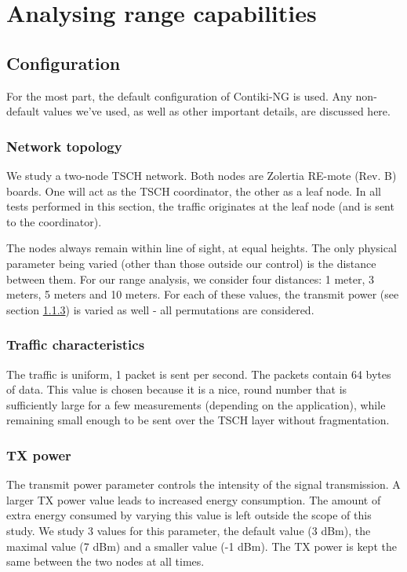 \documentclass[conference]{IEEEtran}
\begin{document}
%
%



\section{Analysing range capabilities}
\label{section:task3}

\subsection{Configuration} 
For the most part, the default configuration of Contiki-NG is used. Any non-default values we've used, as well as other important details, are discussed here.

\subsubsection{Network topology}
We study a two-node TSCH network. Both nodes are Zolertia RE-mote (Rev. B) boards. One will act as the TSCH coordinator, the other as a leaf node. In all tests performed in this section, the traffic originates at the leaf node (and is sent to the coordinator). 

The nodes always remain within line of sight, at equal heights. The only physical parameter being varied (other than those outside our control) is the distance between them. For our range analysis, we consider four distances: 1 meter, 3 meters, 5 meters and 10 meters. For each of these values, the transmit power (see section \ref{section:txpower}) is varied as well - all permutations are considered. 

\subsubsection{Traffic characteristics}
The traffic is uniform, 1 packet is sent per second. The packets contain 64 bytes of data. This value is chosen because it is a nice, round number that is sufficiently large for a few measurements (depending on the application), while remaining small enough to be sent over the TSCH layer without fragmentation. 

\subsubsection{TX power}
\label{section:txpower}
The transmit power parameter controls the intensity of the signal transmission. A larger TX power value leads to increased energy consumption. The amount of extra energy consumed by varying this value is left outside the scope of this study. We study 3 values for this parameter, the default value (3 dBm), the maximal value (7 dBm) and a smaller value (-1 dBm). The TX power is kept the same between the two nodes at all times.
\end{document}
